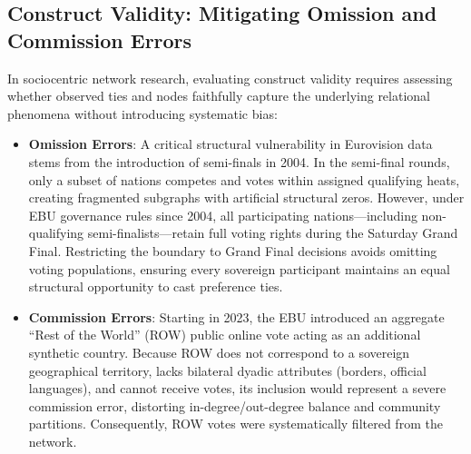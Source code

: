 \subsection{Construct Validity: Mitigating Omission and Commission Errors}
In sociocentric network research, evaluating construct validity requires assessing whether observed ties and nodes faithfully capture the underlying relational phenomena without introducing systematic bias:
\begin{itemize}
    \item \textbf{Omission Errors}: A critical structural vulnerability in Eurovision data stems from the introduction of semi-finals in 2004. In the semi-final rounds, only a subset of nations competes and votes within assigned qualifying heats, creating fragmented subgraphs with artificial structural zeros. However, under EBU governance rules since 2004, all participating nations---including non-qualifying semi-finalists---retain full voting rights during the Saturday Grand Final. Restricting the boundary to Grand Final decisions avoids omitting voting populations, ensuring every sovereign participant maintains an equal structural opportunity to cast preference ties.
    \item \textbf{Commission Errors}: Starting in 2023, the EBU introduced an aggregate ``Rest of the World'' (ROW) public online vote acting as an additional synthetic country. Because ROW does not correspond to a sovereign geographical territory, lacks bilateral dyadic attributes (borders, official languages), and cannot receive votes, its inclusion would represent a severe commission error, distorting in-degree/out-degree balance and community partitions. Consequently, ROW votes were systematically filtered from the network.
\end{itemize}


